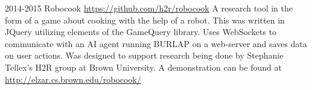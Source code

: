 \documentclass[]{friggeri-cv}
\begin{document}
\begin{entrylist}
\entry
{2014-2015}
{Robocook}
{\href{https://github.com/h2r/robocook}{https://github.com/h2r/robocook}}
{A research tool in the form of a game about cooking with the help of a robot.  This was written in JQuery utilizing elements of the GameQuery library.  Uses WebSockets to communicate with an AI agent running BURLAP on a web-server and saves data on user actions.  Was designed to support research being done by Stephanie Tellex's H2R group at Brown University.  A demonstration can be found at \href{http://elzar.cs.brown.edu/robocook/}{http://elzar.cs.brown.edu/robocook/}}


\end{entrylist}
\end{document}
